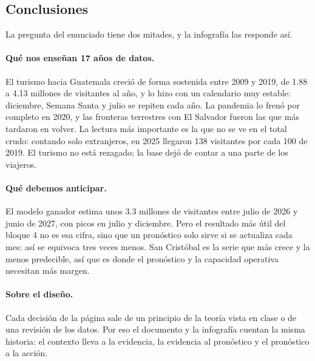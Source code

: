 \subsection{Conclusiones}

La pregunta del enunciado tiene dos mitades, y la infografía las responde así.

\paragraph{Qué nos enseñan 17 años de datos.} El turismo hacia Guatemala creció de
forma sostenida entre 2009 y 2019, de 1.88 a 4.13 millones de visitantes al año, y
lo hizo con un calendario muy estable: diciembre, Semana Santa y julio se repiten
cada año. La pandemia lo frenó por completo en 2020, y las fronteras terrestres
con El Salvador fueron las que más tardaron en volver. La lectura más importante
es la que no se ve en el total crudo: contando solo extranjeros, en 2025 llegaron
138 visitantes por cada 100 de 2019. El turismo no está rezagado; la base dejó de
contar a una parte de los viajeros.

\paragraph{Qué debemos anticipar.} El modelo ganador estima unos 3.3 millones de
visitantes entre julio de 2026 y junio de 2027, con picos en julio y diciembre.
Pero el resultado más útil del bloque 4 no es esa cifra, sino que un pronóstico
solo sirve si se actualiza cada mes: así se equivoca tres veces menos.
San Cristóbal es la serie que más crece y la menos predecible, así que es donde
el pronóstico y la capacidad operativa necesitan más margen.

\paragraph{Sobre el diseño.} Cada decisión de la página sale de un principio de
la teoría vista en clase o de una revisión de los datos. Por eso el documento y la
infografía cuentan la misma historia: el contexto lleva a la evidencia, la
evidencia al pronóstico y el pronóstico a la acción.
